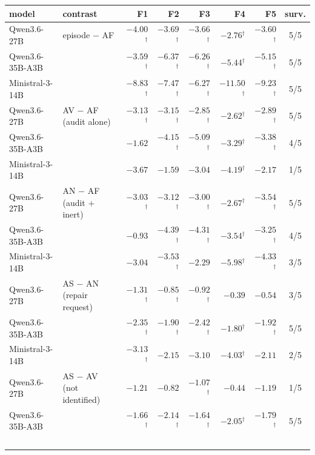 \begin{table}[t]
\centering\small
\begin{tabular}{@{}llrrrrrc@{}}
\toprule
model & contrast & F1 & F2 & F3 & F4 & F5 & surv. \\
\midrule
Qwen3.6-27B & episode $-$ AF & $-4.00$$^{\dagger}$ & $-3.69$$^{\dagger}$ & $-3.66$$^{\dagger}$ & $-2.76$$^{\dagger}$ & $-3.60$$^{\dagger}$ & 5/5 \\
Qwen3.6-35B-A3B &  & $-3.59$$^{\dagger}$ & $-6.37$$^{\dagger}$ & $-6.26$$^{\dagger}$ & $-5.44$$^{\dagger}$ & $-5.15$$^{\dagger}$ & 5/5 \\
Ministral-3-14B &  & $-8.83$$^{\dagger}$ & $-7.47$$^{\dagger}$ & $-6.27$$^{\dagger}$ & $-11.50$$^{\dagger}$ & $-9.23$$^{\dagger}$ & 5/5 \\
\midrule
Qwen3.6-27B & AV $-$ AF \, (audit alone) & $-3.13$$^{\dagger}$ & $-3.15$$^{\dagger}$ & $-2.85$$^{\dagger}$ & $-2.62$$^{\dagger}$ & $-2.89$$^{\dagger}$ & 5/5 \\
Qwen3.6-35B-A3B &  & $-1.62$ & $-4.15$$^{\dagger}$ & $-5.09$$^{\dagger}$ & $-3.29$$^{\dagger}$ & $-3.38$$^{\dagger}$ & 4/5 \\
Ministral-3-14B &  & $-3.67$ & $-1.59$ & $-3.04$ & $-4.19$$^{\dagger}$ & $-2.17$ & 1/5 \\
\midrule
Qwen3.6-27B & AN $-$ AF \, (audit $+$ inert) & $-3.03$$^{\dagger}$ & $-3.12$$^{\dagger}$ & $-3.00$$^{\dagger}$ & $-2.67$$^{\dagger}$ & $-3.54$$^{\dagger}$ & 5/5 \\
Qwen3.6-35B-A3B &  & $-0.93$ & $-4.39$$^{\dagger}$ & $-4.31$$^{\dagger}$ & $-3.54$$^{\dagger}$ & $-3.25$$^{\dagger}$ & 4/5 \\
Ministral-3-14B &  & $-3.04$ & $-3.53$$^{\dagger}$ & $-2.29$ & $-5.98$$^{\dagger}$ & $-4.33$$^{\dagger}$ & 3/5 \\
\midrule
Qwen3.6-27B & AS $-$ AN \, (repair request) & $-1.31$$^{\dagger}$ & $-0.85$$^{\dagger}$ & $-0.92$$^{\dagger}$ & $-0.39$ & $-0.54$ & 3/5 \\
Qwen3.6-35B-A3B &  & $-2.35$$^{\dagger}$ & $-1.90$$^{\dagger}$ & $-2.42$$^{\dagger}$ & $-1.80$$^{\dagger}$ & $-1.92$$^{\dagger}$ & 5/5 \\
Ministral-3-14B &  & $-3.13$$^{\dagger}$ & $-2.15$ & $-3.10$ & $-4.03$$^{\dagger}$ & $-2.11$ & 2/5 \\
\midrule
Qwen3.6-27B & AS $-$ AV \, (not identified) & $-1.21$ & $-0.82$ & $-1.07$$^{\dagger}$ & $-0.44$ & $-1.19$ & 1/5 \\
Qwen3.6-35B-A3B &  & $-1.66$$^{\dagger}$ & $-2.14$$^{\dagger}$ & $-1.64$$^{\dagger}$ & $-2.05$$^{\dagger}$ & $-1.79$$^{\dagger}$ & 5/5 \\
$$
\end{tabular}
\end{table}
